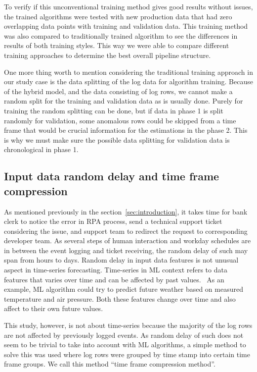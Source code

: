 To verify if this unconventional training method gives good results without issues,
the trained algorithms were tested with new production data
that had zero overlapping data points with training and validation data.
This training method was also compared to traditionally trained algorithm
to see the differences in results of both training styles.
This way we were able to compare different training approaches
to determine the best overall pipeline structure.

One more thing worth to mention considering
the traditional training approach in our study case
is the data splitting of the log data for algorithm training.
Because of the hybrid model,
and the data consisting of log rows,
we cannot make a random split for the training and validation data
as is usually done.
Purely for training
the random splitting can be done,
but if data in phase 1 is split randomly for validation,
some anomalous rows could be skipped from a time frame
that would be crucial information for the estimations in the phase 2.
This is why we must make sure the possible data splitting for validation data
is chronological in phase 1.



\subsection{Input data random delay and time frame compression}\label{subsec:pipe-random-delay-and-timeframe-compression}

As mentioned previously in the section~\ref{sec:introduction},
it takes time for bank clerk to notice the error in RPA process,
send a technical support ticket considering the issue,
and support team to redirect the request to corresponding developer team.
As several steps of human interaction and workday schedules
are in between the event logging and ticket receiving,
the random delay of such may span from hours to days.
Random delay in input data features
is not unusual aspect in time-series forecasting.
Time-series in ML context
refers to data features that varies over time
and can be affected by past values.~\cite{palma2016time}
As an example,
ML algorithm could try to predict future weather
based on measured temperature and air pressure.
Both these features change over time
and also affect to their own future values.

This study, however,
is not about time-series
because the majority of the log rows
are not affected by previously logged events.
As random delay of such
does not seem to be trivial to take into account
with ML algorithms,
a simple method to solve this was used
where log rows were grouped by time stamp
into certain time frame groups.
We call this method \enquote{time frame compression method}.

